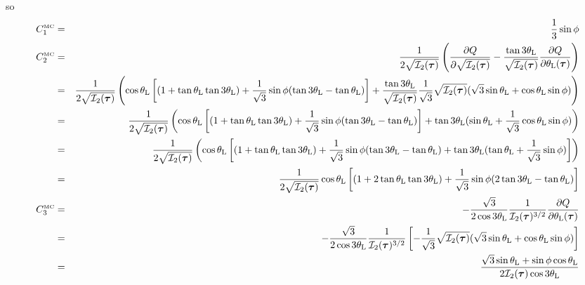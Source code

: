 so
\begin{eqnarray}
C_1^{\text{\tiny MC}} &=& \frac13 \sin\phi  \\ 
C_2^{\text{\tiny MC}} 
&=& 
\frac{1}{2 \sqrt{ {\cal I}_2(\bm\tau)}   }   
\left( \frac{\partial Q}{\partial \sqrt{{\cal I}_2(\bm\tau)}} 
- \frac{\tan 3\theta_{\rm L}}{\sqrt {{\cal I}_2(\bm\tau)}}
\frac{\partial Q}{\partial \theta_{\rm L}(\bm\tau)}  
\right) \nonumber\\
&=& 
\frac{1}{2 \sqrt{ {\cal I}_2(\bm\tau)}   }   
\left( \cos \theta_{\rm L} \left[
(1 +  \tan \theta_{\rm L}   \tan 3\theta_{\rm L})
+\frac{1}{\sqrt{3}} \sin\phi ( \tan 3\theta_{\rm L} - \tan\theta_{\rm L}) \right]
+ \frac{\tan 3\theta_{\rm L}}{\sqrt {{\cal I}_2(\bm\tau)}}
\frac{1}{\sqrt{3}} \sqrt{{\cal I}_2(\bm \tau)} (\sqrt{3} \sin\theta_{\rm L}+\cos\theta_{\rm L} \sin\phi )
\right) \nonumber\\
&=& 
\frac{1}{2 \sqrt{ {\cal I}_2(\bm\tau)}   }   
\left( \cos \theta_{\rm L}
\left[ (1 +  \tan \theta_{\rm L}   \tan 3\theta_{\rm L})
+\frac{1}{\sqrt{3}} \sin\phi
( \tan 3\theta_{\rm L} - \tan\theta_{\rm L}) \right]
+ \tan 3\theta_{\rm L}  ( \sin\theta_{\rm L}+\frac{1}{\sqrt{3}}\cos\theta_{\rm L} \sin\phi )
\right) \nonumber\\
&=& 
\frac{1}{2 \sqrt{ {\cal I}_2(\bm\tau)}   }   
\left( \cos \theta_{\rm L} \left[
(1 +  \tan \theta_{\rm L}   \tan 3\theta_{\rm L})
+\frac{1}{\sqrt{3}} \sin\phi
( \tan 3\theta_{\rm L} - \tan\theta_{\rm L})
+ \tan 3\theta_{\rm L}   ( \tan\theta_{\rm L}+\frac{1}{\sqrt{3}} \sin\phi )
\right] \right) \nonumber\\
&=& 
\frac{1}{2 \sqrt{ {\cal I}_2(\bm\tau)}   }   
\cos \theta_{\rm L} \left[
(1 +  2\tan \theta_{\rm L}   \tan 3\theta_{\rm L})
+\frac{1}{\sqrt{3}} \sin\phi ( 2\tan 3\theta_{\rm L} - \tan\theta_{\rm L})
\right] \nonumber\\
C_3^{\text{\tiny MC}} 
&=&  - \frac{\sqrt{3}}{2\cos 3\theta_{\rm L}}
\frac{1}{{\cal I}_2(\bm\tau)^{3/2}} 
\frac{\partial Q}{\partial \theta_{\rm L}(\bm\tau)} \nonumber\\ 
&=&  - \frac{\sqrt{3}}{2\cos 3\theta_{\rm L}}
\frac{1}{{\cal I}_2(\bm\tau)^{3/2}} 
\left[-\frac{1}{\sqrt{3}} \sqrt{{\cal I}_2(\bm \tau)} (\sqrt{3} \sin\theta_{\rm L}+\cos\theta_{\rm L} 
\sin\phi ) \right]  \nonumber\\
&=&  \frac{\sqrt{3}\sin\theta_{\rm L} +  \sin \phi \cos \theta_{\rm L}}
{2 {\cal I}_2({\bm \tau}) \cos 3\theta_{\rm L}}
\end{eqnarray}










